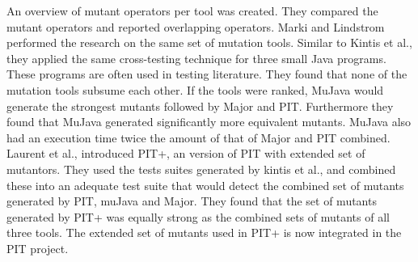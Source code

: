 \documentclass[../main]{subfiles}
\begin{document}
An overview of mutant operators per tool was created. 
They compared the mutant operators and reported overlapping operators.
\newline
Marki and Lindstrom performed the research on the same set of mutation tools\cite{Marki2017MutationJava}. 
Similar to Kintis et al., they applied the same cross-testing technique for three small Java programs. 
These programs are often used in testing literature.
They found that none of the mutation tools subsume  each other. 
If the tools were ranked,  MuJava would generate the strongest mutants followed by Major and PIT.
Furthermore they found that  MuJava generated significantly more equivalent mutants.
MuJava also had an execution time twice the amount of that of Major and PIT combined.
\newline
Laurent et al., introduced PIT+, an version of PIT with extended set of mutantors\cite{Laurent2017AssessingPIT}.
They used the tests suites generated by kintis et al., and combined these into an adequate test suite that would detect the combined set of mutants generated by PIT, muJava and Major. 
They found that the set of mutants generated by PIT+ was equally strong as the combined sets of mutants of all three tools. 
The extended set of mutants used in PIT+ is now integrated in the PIT project\cite{pit+}.
\end{document}
